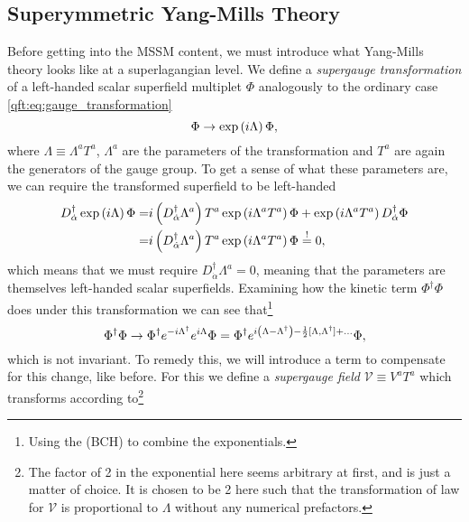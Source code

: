 \documentclass[../main.tex]{subfiles}
\begin{document}
\subsection{Superymmetric Yang-Mills Theory}
\label{susy:ssec:susy_yang_mills}
Before getting into the MSSM content, we must introduce what Yang-Mills theory
looks like at a superlagangian level. We define a \emph{supergauge
  transformation} of a left-handed scalar superfield multiplet \(\Phi\)
analogously to the ordinary case \cref{qft:eq:gauge_transformation}
\begin{equation}
  \label{susy:eq:supergauge_transformation}
  \Phi \to \operatorname{exp}\left(i \Lambda\right) \Phi,
\end{equation}
where \(\Lambda \equiv \Lambda^a T^a\), \(\Lambda^a\) are the parameters of the transformation and \(T^a\) are again the generators of the gauge group.
To get a sense of what these parameters are, we can require the transformed superfield to be left-handed
\begin{align*}
  D_{\dot{\alpha}}^\dagger \operatorname{exp}\left(i\Lambda\right) \Phi = & i\left(D_{\dot{\alpha}}^\dagger \Lambda^a\right) T^a \operatorname{exp}\left(i\Lambda^a T^a\right) \Phi + \operatorname{exp}\left(i\Lambda^a T^a\right) D_{\dot{\alpha}}^\dagger \Phi \\
  =                                                  & i\left(D_{\dot{\alpha}}^\dagger \Lambda^a\right) T^a \operatorname{exp}\left(i\Lambda^a T^a\right) \Phi \overset{!}{=} 0,
\end{align*}
which means that we must require \(D_{\dot{\alpha}}^\dagger \Lambda^a = 0\), meaning that the parameters are themselves left-handed scalar superfields.
Examining how the kinetic term \(\Phi^\dagger \Phi\) does under this transformation we can see that\footnote{Using the  (BCH) to combine the exponentials.}
\begin{equation}
  \Phi^\dagger \Phi \to \Phi^\dagger e^{-i\Lambda^\dagger} e^{i\Lambda} \Phi = \Phi^\dagger e^{i\left(\Lambda - \Lambda^\dagger\right) - \frac{1}{2} [\Lambda,\Lambda^\dagger] + \ldots} \Phi,
\end{equation}
which is not invariant.
To remedy this, we will introduce a term to compensate for this change, like before.
For this we define a   \emph{supergauge field} \(\mathcal{V} \equiv V^a T^a\) which transforms according to\footnote{The factor of 2 in the exponential here seems arbitrary at first, and is just a matter of choice. It is chosen to be 2 here such that the transformation of law for \(\mathcal{V}\) is proportional to \(\Lambda\) without any numerical prefactors.}
\end{document}
